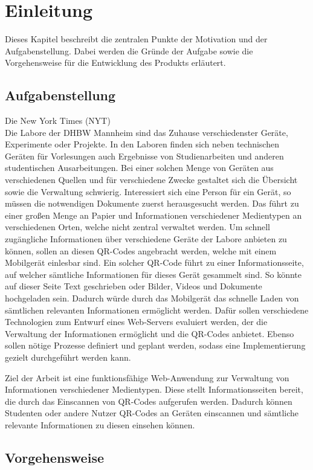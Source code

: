 \chapter{Einleitung}
\label{chap:1-intro}
\setcounter{page}{1}

Dieses Kapitel beschreibt die zentralen Punkte der Motivation und der Aufgabenstellung. Dabei werden die Gründe der Aufgabe sowie die Vorgehensweise für die Entwicklung des Produkts erläutert.

\section{Aufgabenstellung} 
\label{sec:problem}

Die New York Times (NYT)
\\
Die Labore der DHBW Mannheim sind das Zuhause verschiedenster Geräte, Experimente oder Projekte. In den Laboren finden sich neben technischen Geräten für Vorlesungen auch Ergebnisse von Studienarbeiten und anderen 
studentischen Ausarbeitungen. Bei einer solchen Menge von Geräten aus verschiedenen Quellen und für verschiedene Zwecke gestaltet sich die Übersicht sowie die Verwaltung schwierig. Interessiert sich eine Person für 
ein Gerät, so müssen die notwendigen Dokumente zuerst herausgesucht werden. Das führt zu einer großen Menge an Papier und Informationen verschiedener Medientypen an verschiedenen Orten, welche nicht zentral verwaltet 
werden. Um schnell zugängliche Informationen über verschiedene Geräte der Labore anbieten zu können, sollen an diesen QR-Codes angebracht werden, welche mit einem Mobilgerät einlesbar sind. Ein solcher QR-Code führt 
zu einer Informationsseite, auf welcher sämtliche Informationen für dieses Gerät gesammelt sind. So könnte auf dieser Seite Text geschrieben oder Bilder, Videos und Dokumente hochgeladen sein. Dadurch würde durch das 
Mobilgerät das schnelle Laden von sämtlichen relevanten Informationen ermöglicht werden. Dafür sollen verschiedene Technologien zum Entwurf eines Web-Servers evaluiert werden, der die Verwaltung der Informationen ermöglicht 
und die QR-Codes anbietet. Ebenso sollen nötige Prozesse definiert und geplant werden, sodass eine Implementierung gezielt durchgeführt werden kann. 

Ziel der Arbeit ist eine funktionsfähige Web-Anwendung zur Verwaltung von Informationen verschiedener Medientypen. Diese stellt Informationsseiten bereit, die durch das Einscannen von QR-Codes aufgerufen werden. Dadurch 
können Studenten oder andere Nutzer QR-Codes an Geräten einscannen und sämtliche relevante Informationen zu diesen einsehen können.

\section{Vorgehensweise} 

